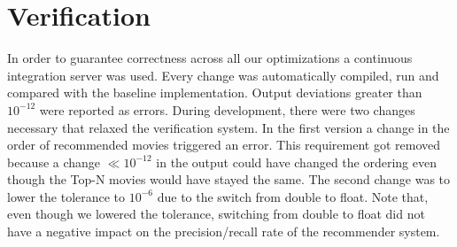 \section{Verification}\label{sec:verification}
In order to guarantee correctness across all our optimizations a continuous integration server was used. Every change was automatically compiled, run and compared with the baseline implementation. Output deviations greater than $10^{-12}$ were reported as errors. During development, there were two changes necessary that relaxed the verification system. In the first version a change in the order of recommended movies triggered an error. This requirement got removed because a change $ \ll 10^{-12}$ in the output could have changed the ordering even though the Top-N movies would have stayed the same. The second change was to lower the tolerance to $10^{-6}$ due to the switch from double to float. Note that, even though we lowered the tolerance, switching from double to float did not have a negative impact on the precision/recall rate of the recommender system.
